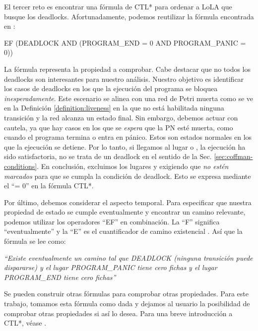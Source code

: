 El tercer reto es encontrar una fórmula de \acrfull{CTL*} para ordenar
a \acrshort{LoLA} que busque los deadlocks.
Afortunadamente, podemos reutilizar la fórmula encontrada
en \cite{meyer2020}:

\begin{center}
  EF (DEADLOCK AND (PROGRAM\_END = 0 AND PROGRAM\_PANIC = 0))
\end{center}

La fórmula representa la propiedad a comprobar.
Cabe destacar que no todos los deadlocks son interesantes para nuestro análisis.
Nuestro objetivo es identificar los casos de deadlocks en
los que la ejecución del programa se bloquea \emph{inesperadamente}.
Este escenario se alinea con una red de Petri
muerta como se ve en la Definición \ref{definition:liveness} en la que no está habilitada ninguna transición
y la red alcanza un estado final.
Sin embargo, debemos actuar con cautela, ya que hay casos en los que se \emph{espera}
que la \acrshort{PN} esté muerta, como cuando el programa termina o entra en pánico.
Estos son estados normales en los que la ejecución se detiene.
Por lo tanto, si llegamos al lugar 
o , la ejecución ha sido satisfactoria, no se trata de un deadlock en el sentido
de la Sec. \ref{sec:coffman-conditions}.
En conclusión, excluimos los lugares  y 
exigiendo que \emph{no estén marcados} para que se cumpla la condición de deadlock.
Esto se expresa mediante el ``= 0'' en la fórmula \acrshort{CTL*}.

Por último, debemos considerar el aspecto temporal.
Para especificar que nuestra propiedad de
estado se cumple eventualmente y encontrar un camino relevante, podemos utilizar los
operadores ``EF'' en combinación. La ``F'' significa ``eventualmente'' y la ``E'' es el cuantificador
de camino existencial \cite{meyer2020}. Así que la fórmula se lee como:

\emph{``Existe eventualmente un camino tal que DEADLOCK (ninguna transición puede dispararse) y
el lugar PROGRAM\_PANIC tiene cero fichas y el lugar PROGRAM\_END tiene cero fichas''}

Se pueden construir otras fórmulas para comprobar otras propiedades. Para este trabajo,
tomamos esta fórmula como dada y dejamos al usuario la posibilidad de comprobar otras
propiedades si así lo desea. Para una breve introducción a \acrshort{CTL*}, véase \cite{meyer2020}.